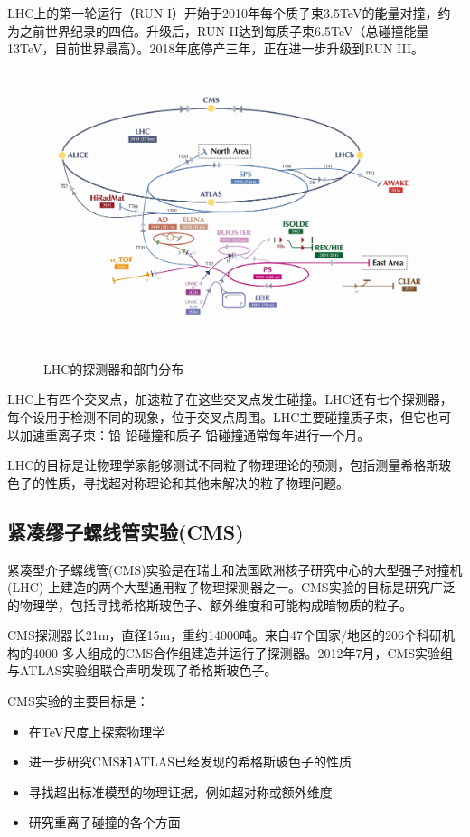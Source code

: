 LHC上的第一轮运行（RUN I）开始于2010年每个质子束3.5TeV的能量对撞，约为之前世界纪录的四倍。升级后，RUN II达到每质子束6.5TeV（总碰撞能量13TeV，目前世界最高）。2018年底停产三年，正在进一步升级到RUN III。

\begin{figure}[H]
 \centering
 \caption{LHC的探测器和部门分布\cite{LHC-complex}}
 \includegraphics[height=8cm, width=14cm]{pictures/CERN_accelerator_complex_(cropped_2).jpeg}
 \label{fig:1.5}
\end{figure}


LHC上有四个交叉点，加速粒子在这些交叉点发生碰撞。LHC还有七个探测器，每个设用于检测不同的现象，位于交叉点周围。LHC主要碰撞质子束，但它也可以加速重离子束：铅-铅碰撞和质子-铅碰撞通常每年进行一个月。

LHC的目标是让物理学家能够测试不同粒子物理理论的预测，包括测量希格斯玻色子的性质，寻找超对称理论和其他未解决的粒子物理问题。

\subsection{紧凑缪子螺线管实验(CMS)}
紧凑型介子螺线管(CMS)实验是在瑞士和法国欧洲核子研究中心的大型强子对撞机(LHC) 上建造的两个大型通用粒子物理探测器之一。CMS实验的目标是研究广泛的物理学，包括寻找希格斯玻色子、额外维度和可能构成暗物质的粒子。

CMS探测器长21m，直径15m，重约14000吨。来自47个国家/地区的206个科研机构的4000 多人组成的CMS合作组建造并运行了探测器。2012年7月，CMS实验组与ATLAS实验组联合声明发现了希格斯玻色子。

CMS实验的主要目标是：
\begin{itemize}
    \item 在TeV尺度上探索物理学
    \item 进一步研究CMS和ATLAS已经发现的希格斯玻色子的性质
    \item 寻找超出标准模型的物理证据，例如超对称或额外维度
    \item 研究重离子碰撞的各个方面
\end{itemize}

